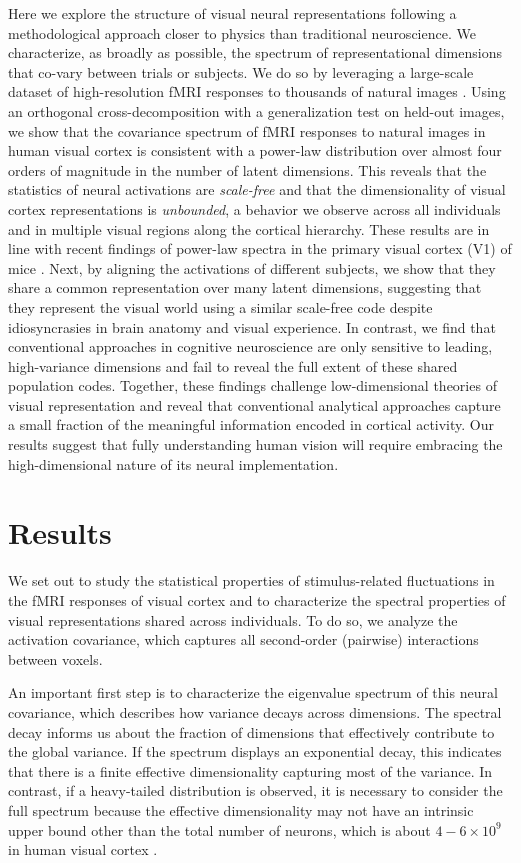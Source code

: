 \documentclass[10pt]{article}
\begin{document}
Here we explore the structure of visual neural representations following a methodological approach closer to physics than traditional neuroscience. We characterize, as broadly as possible, the spectrum of representational dimensions that co-vary between trials or subjects. We do so by leveraging a large-scale dataset of high-resolution fMRI responses to thousands of natural images \autocite{Allen2021}. Using an orthogonal cross-decomposition with a generalization test on held-out images, we show that the covariance spectrum of fMRI responses to natural images in human visual cortex is consistent with a power-law distribution over almost four orders of magnitude in the number of latent dimensions. This reveals that the statistics of neural activations are \emph{scale-free} and that the dimensionality of visual cortex representations is \emph{unbounded}, a behavior we observe across all individuals and in multiple visual regions along the cortical hierarchy. These results are in line with recent findings of power-law spectra in the primary visual cortex (V1) of mice \autocite{Stringer2019}. Next, by aligning the activations of different subjects, we show that they share a common representation over many latent dimensions, suggesting that they represent the visual world using a similar scale-free code despite idiosyncrasies in brain anatomy and visual experience. In contrast, we find that conventional approaches in cognitive neuroscience are only sensitive to leading, high-variance dimensions and fail to reveal the full extent of these shared population codes. Together, these findings challenge low-dimensional theories of visual representation and reveal that conventional analytical approaches capture a small fraction of the meaningful information encoded in cortical activity. Our results suggest that fully understanding human vision will require embracing the high-dimensional nature of its neural implementation.

\section{Results}\label{results}

We set out to study the statistical properties of stimulus-related fluctuations in the fMRI responses of visual cortex and to characterize the spectral properties of visual representations shared across individuals. To do so, we analyze the activation covariance, which captures all second-order (pairwise) interactions between voxels.

An important first step is to characterize the eigenvalue spectrum of this neural covariance, which describes how variance decays across dimensions. The spectral decay informs us about the fraction of dimensions that effectively contribute to the global variance. If the spectrum displays an exponential decay, this indicates that there is a finite effective dimensionality capturing most of the variance. In contrast, if a heavy-tailed distribution is observed, it is necessary to consider the full spectrum because the effective dimensionality may not have an intrinsic upper bound other than the total number of neurons, which is about \(4-6 \times 10^9\) in human visual cortex \autocite{Wandell2009}.
\end{document}
